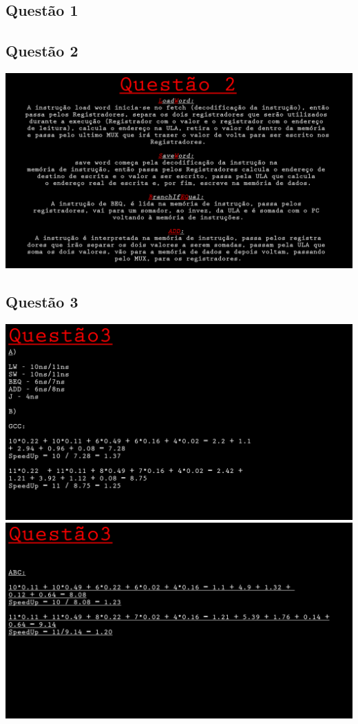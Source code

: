 \documentclass{article}
\begin{document}
\subsection{Questão 1}

\newpage

\subsection{Questão 2}
\centering
\includegraphics{Lista2/Parte4/Questao2.png}
\newpage

\subsection{Questão 3}
\centering
\includegraphics{Lista2/Parte4/Questao3.png}
\includegraphics{Lista2/Parte4/Questao3_1.png}
\newpage
\end{document}

